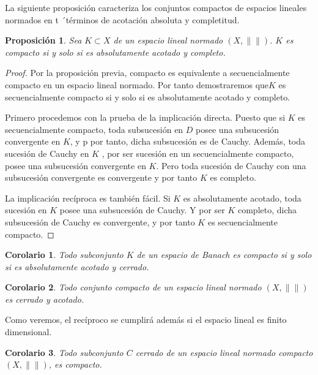 \documentclass[12pt]{book}
\newtheorem{prop}{\bf Proposición}[chapter]
\newtheorem{coro}{Corolario}[chapter]
\newcommand{\norm}[1]{\lVert #1\rVert }
\begin{document}
La siguiente proposición caracteriza los conjuntos compactos de espacios lineales normados en t
´términos de acotación  absoluta y completitud.
\begin{prop}
Sea $K\subset X$  de un espacio lineal normado $(X,\norm{})$. $K$ es compacto si y solo si es 
absolutamente acotado  y completo.
\end{prop}
\begin{proof}
Por la proposición previa, compacto es equivalente a secuencialmente compacto en un espacio 
lineal normado. Por tanto demostraremos que$K$ es  secuencialmente compacto si y solo si  es 
absolutamente acotado y completo. 

Primero procedemos con la prueba de la implicación directa. Puesto que si $K$   es 
secuencialmente compacto, toda subsucesión en $D$ posee una subsucesión convergente en 
$K$, y p por tanto, dicha subsucesión es de Cauchy. Además, toda sucesión de Cauchy en $K$ , 
por ser sucesión en un secuencialmente compacto, posee una subsucesión convergente en $K$. 
Pero toda sucesión de Cauchy con una subsucesión convergente  es convergente y por tanto $K$ 
es completo.

 La implicación recíproca es también fácil. Si  $K$  es absolutamente acotado, toda sucesión en 
$K$ posee una subsucesión de Cauchy. Y por ser $K$ completo, dicha subsucesión de Cauchy es 
convergente,  y por tanto $K$  es secuencialmente compacto.
 \end{proof}
 
 \begin{coro} Todo subconjunto $K$ de un espacio de Banach es compacto  si y solo si es 
absolutamente acotado  y cerrado.
 \end{coro}
 \begin{coro}
 Todo conjunto compacto de un espacio lineal normado $(X,\norm{})$ es cerrado y acotado.
 \end{coro}
 Como veremos, el recíproco se cumplirá además si el espacio lineal es finito dimensional.
 \begin{coro}

Todo subconjunto $C$ cerrado de un espacio lineal normado compacto $(X,\norm{})$,  es 
compacto.
\end{coro}
\end{document}
